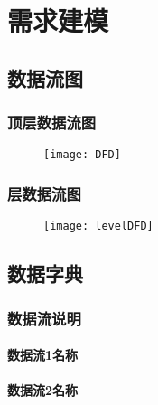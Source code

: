 \chapter{需求建模 }
\section{数据流图}
\subsection{顶层数据流图}
\iffalse
<Draw the Top-level DFD here>

在这里画出顶层数据流图
\fi
  \begin{figure}[!h]
  	\centering
	\texttt{[image: DFD]}
	\label{fig:noted-figure}
  \end{figure}
\subsection{层数据流图}
\iffalse
<Draw the Level-0 DFD here>

在这里画出0层数据流图
\fi
  \begin{figure}[!h]
  	\centering
	\texttt{[image: levelDFD]}
	\label{fig:noted-figure}
  \end{figure}

\section{数据字典}
\subsection{数据流说明}
\subsubsection{数据流1名称}
\iffalse
<Title of  the data flow should accord with the one in data flow diagram, and the Data description notions should be used.  >

与数据流图中的名称一致，采用数据描述符号说明数据流的内容
\fi
\subsubsection{数据流2名称}
\iffalse
<Title of  the data flow should accord with the one in data flow diagram, and the Data description notions should be used   >

与数据流图中的名称一致，采用数据描述符号说明数据流的内容
\fi
